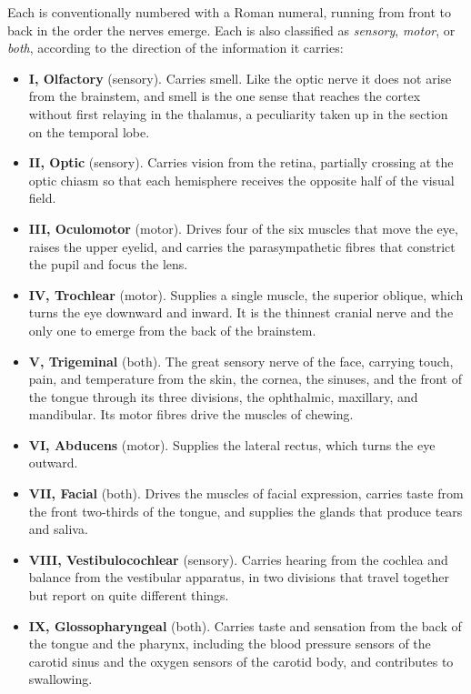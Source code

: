 \documentclass[11pt]{article}
\begin{document}
Each is conventionally numbered with a Roman numeral, running from front to back in the order the nerves emerge. Each is also classified as \textit{sensory}, \textit{motor}, or \textit{both}, according to the direction of the information it carries:

\begin{itemize}
    \item \textbf{I, Olfactory} (sensory). Carries smell. Like the optic nerve it does not arise from the brainstem, and smell is the one sense that reaches the cortex without first relaying in the thalamus, a peculiarity taken up in the section on the temporal lobe.
    \item \textbf{II, Optic} (sensory). Carries vision from the retina, partially crossing at the optic chiasm so that each hemisphere receives the opposite half of the visual field.
    \item \textbf{III, Oculomotor} (motor). Drives four of the six muscles that move the eye, raises the upper eyelid, and carries the parasympathetic fibres that constrict the pupil and focus the lens.
    \item \textbf{IV, Trochlear} (motor). Supplies a single muscle, the superior oblique, which turns the eye downward and inward. It is the thinnest cranial nerve and the only one to emerge from the back of the brainstem.
    \item \textbf{V, Trigeminal} (both). The great sensory nerve of the face, carrying touch, pain, and temperature from the skin, the cornea, the sinuses, and the front of the tongue through its three divisions, the ophthalmic, maxillary, and mandibular. Its motor fibres drive the muscles of chewing.
    \item \textbf{VI, Abducens} (motor). Supplies the lateral rectus, which turns the eye outward.
    \item \textbf{VII, Facial} (both). Drives the muscles of facial expression, carries taste from the front two-thirds of the tongue, and supplies the glands that produce tears and saliva.
    \item \textbf{VIII, Vestibulocochlear} (sensory). Carries hearing from the cochlea and balance from the vestibular apparatus, in two divisions that travel together but report on quite different things.
    \item \textbf{IX, Glossopharyngeal} (both). Carries taste and sensation from the back of the tongue and the pharynx, including the blood pressure sensors of the carotid sinus and the oxygen sensors of the carotid body, and contributes to swallowing.

\end{itemize}
\end{document}
